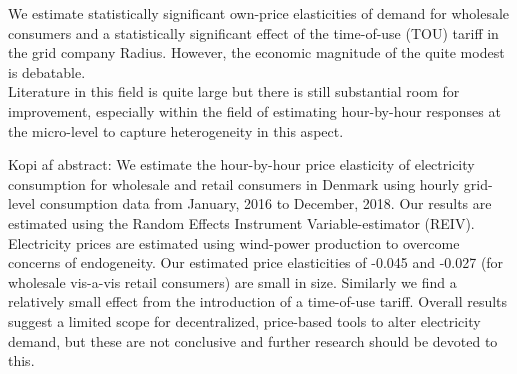 \label{sec:conclusion}
We estimate statistically significant own-price elasticities of demand for wholesale consumers and a statistically significant effect of the time-of-use (TOU) tariff in the grid company Radius. However, the economic magnitude of the quite modest is debatable.
\medskip \\
Literature in this field is quite large but there is still substantial room for improvement, especially within the field of estimating hour-by-hour responses at the micro-level to capture heterogeneity in this aspect.

Kopi af abstract: 
We estimate the hour-by-hour price elasticity of electricity consumption for wholesale and retail consumers in Denmark using hourly grid-level consumption data from January, 2016 to December, 2018.  Our results are estimated using the Random Effects Instrument Variable-estimator (REIV). Electricity prices are estimated using wind-power production to overcome concerns of endogeneity. Our estimated price elasticities of -0.045 and -0.027 (for wholesale vis-a-vis retail consumers) are small in size. Similarly we find a relatively small effect from the introduction of a time-of-use tariff. Overall results suggest a limited scope for decentralized, price-based tools to alter electricity demand, but these are not conclusive and further research should be devoted to this. 